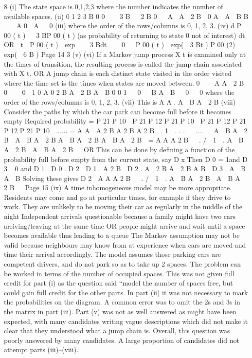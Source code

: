 8
(i)
The state space is {0,1,2,3} where the number indicates the number of available
spaces.
(ii)
0
1
2
3 B
0
0 
  3 B


2 B
0 
 A  A  2 B
 0
A
 A  B B 


A
0
 A 
 0
(iii)
where the order of the rows/columns is {0, 1, 2, 3}.
(iv)
d
P 00 ( t )   3 BP 00 ( t ) (as probability of returning to state 0 not of interest)
dt
OR
 t

P 00 ( t )  exp    3 Bdt 
  0
 
P 00 ( t )  exp(  3 Bt )
P 00 (2)  exp(  6 B )
Page 14
3%
(v)
(vi)
If a Markov jump process X t is examined only at the times of transition, the resulting
process is called the jump chain associated with X t.
OR
A jump chain is each distinct state visited in the order visited where the time set is the
times when states are moved between.
0


 A A  2 B

0

 
0

1
0
A
0
2 B
A  2 B
A  B
0
0
1


0 

B
A  B 

0  
0
where the order of the rows/columns is {0, 1, 2, 3}.
(vii)
This is
A
A
.
A  B A  2 B
(viii) Consider the paths by which the car park can become full before it becomes
empty
Required probability = P 21 P 10  P 21 P 12 P 21 P 10  P 21 P 12 P 21 P 12 P 21 P 10  ......
= A
A 
A
2 B
A
2 B
A
2 B

.
1 
.
.
.

 .... 

A  B A  2 B  A  B A  2 B A  B A  2 B A  B A  2 B

= A
A
A
2 B 

.
/  1 
.
A  B A  2 B  A  B A  2 B  
OR
This can be done by defining a function of the probability full before empty from the
current state, say D x
Then D 0 = 1and D 3 =0
and D 1  D 0 .
D 2  D 1 .
A
2 B
 D 2 .
A  2 B
A  2 B
A
B
 D 3 .
A  B
A  B
Solving these gives
D 2 
A
A
A
2 B 

.
/  1 
.
A  B A  2 B  A  B A  2 B  
Page 15%
(ix)
A time inhomogeneous model may be more appropriate.
Residents may come and go at particular times, for example if they drive to work.
They are unlikely to be moving their car as regularly in the middle of the night
Independent arrivals questionable because a family might have two cars
arriving/leaving at the same time OR people might arrive and wait until a space
becomes available thus leading to a queue
The Markov assumption may not be valid because neighbours may know from at
experience when cars are moved and time their arrival accordingly.
The model assumes those parking cars are competent drivers, and do not park so as to
take up 2 spaces.
The problem can be worked in terms of the number of occupied spaces. This was not given
full credit for part (i) as the question said “model the number of spaces free, but could gain
full credit for the other parts. In part (ii) it was not necessary to mark the probabilities on the
diagram. A common error was to omit the 2s and 3s in the matrix in part (iii). Part (v) was
not as well answered as might have been expected, with many candidates writing vague
descriptions which did not make it clear that they understood what a jump chain is.
Overall, this question was poorly answered by many candidates. A large proportion of
candidates did not attempt parts (iii)–(viii).


